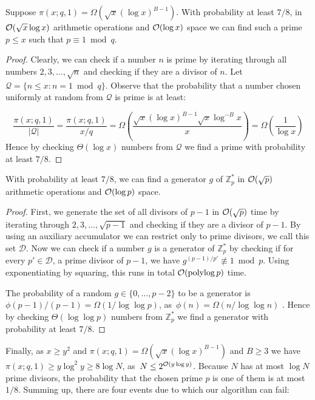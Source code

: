 \begin{lemma}
 Suppose $\pi(x;q,1) = \Omega(\sqrt{x}(\log x)^{B-1})$. With probability at least $7/8$, in $\mathcal{O}(\sqrt x\log x)$ arithmetic operations and $\mathcal{O}(\log x)$ space we can find such a prime $p\leq x$ such that $p \equiv 1 \bmod q$.
\end{lemma}
\begin{proof}
Clearly, we can check if a number $n$ is prime by iterating through all numbers $2,3,\ldots,\sqrt n$ and checking if they are a divisor of $n$.
Let $\mathcal{Q}=\{n\leq x: n =1 \bmod q\}$.
Observe that the probability that a number chosen uniformly at random from $\mathcal{Q}$ is prime is at least:

\[
 \frac{\pi(x;q,1)}{|\mathcal{Q}|}=\frac{\pi(x;q,1)}{x/q}=\Omega\left(\frac{\sqrt{x}(\log x)^{B-1}\sqrt x\log^{-B}x}{x}\right)=\Omega\left(\frac{1}{\log x}\right)
\]
Hence by checking $\Theta(\log x)$ numbers from $\mathcal{Q}$ we find a prime with probability at least $7/8$.
\end{proof}

\begin{lemma}
With probability at least $7/8$, we can find a generator $g$ of $\mathbb{Z}^{*}_{p}$ in $\mathcal{O}(\sqrt p)$ arithmetic operations and $\mathcal{O}(\log p)$ space.
\end{lemma}
\begin{proof}

First, we generate the set of all divisors of $p-1$ in $\mathcal{O}(\sqrt p)$ time by iterating through $2,3,\ldots, \sqrt{p-1}$ and checking if they are a divisor of $p-1$.
By using an auxiliary accumulator we can restrict only to prime divisors, we call this set $\mathcal{D}$.
Now we can check if a number $g$ is a generator of $\mathbb{Z}^{*}_{p}$ by checking if for every $p'\in\mathcal{D}$, a prime divisor of $p-1$, we have $g^{(p-1)/p'}\not\equiv 1 \bmod p$. Using exponentiating by squaring, this runs in total $\mathcal{O}(\operatorname{polylog} p)$ time.

The probability of a random $g\in \{0,\ldots,p-2\}$ to be a generator is $\phi(p-1)/(p-1) = \Omega(1/\log\log p)$, as~$\phi(n)=\Omega(n/\log\log n)$ \cite[Theorem 15]{RosserS62}.
Hence by checking $\Theta(\log \log p)$ numbers from $\mathbb{Z}^{*}_{p}$ we find a generator with probability at least $7/8$.
\end{proof}

Finally, as $x\geq y^2$ and $\pi(x;q,1) = \Omega(\sqrt{x}(\log x)^{B-1})$ and $B\geq 3$ we have $\pi(x;q,1) \geq y\log^2 y \geq 8\log N$, as~$N\leq 2^{\mathcal{O}(y\log y)}$.
Because $N$ has at most $\log N$ prime divisors, the probability that the chosen prime $p$ is one of them is at most $1/8$.
Summing up, there are four events due to which our algorithm can fail:


